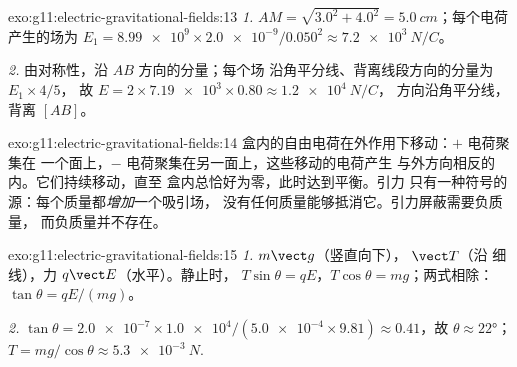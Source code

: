\begin{solution}{exo:g11:electric-gravitational-fields:13}
\emph{1.} $AM = \sqrt{3.0^2 + 4.0^2} = \qty{5.0}{cm}$；每个电荷
产生的场为 $E_1 = \num{8.99e9} \times \num{2.0e-9} / 0.050^2
\approx \qty{7.2e3}{N/C}$。

\emph{2.} 由对称性，沿 $AB$ 方向的分量；每个场
沿角平分线、背离线段方向的分量为 $E_1 \times 4/5$，
故 $E = 2 \times \num{7.19e3} \times 0.80 \approx \qty{1.2e4}{N/C}$，
方向沿角平分线，背离 $[AB]$。
\end{solution}

\begin{solution}{exo:g11:electric-gravitational-fields:14}
盒内的自由电荷在外作用下移动：$+$ 电荷聚集在
一个面上，$-$ 电荷聚集在另一面上，这些移动的电荷产生
与外方向相反的内。它们持续移动，直至
盒内总恰好为零，此时达到平衡。引力
只有一种符号的源：每个质量都\emph{增加}一个吸引场，
没有任何质量能够抵消它。引力屏蔽需要负质量，
而负质量并不存在。
\end{solution}

\begin{solution}{exo:g11:electric-gravitational-fields:15}
\emph{1.}  $m\vect g$（竖直向下）， $\vect T$（沿
细线），力 $q\vect E$（水平）。静止时，
$T\sin\theta = qE$，$T\cos\theta = mg$；两式相除：
$\tan\theta = qE/(mg)$。

\emph{2.} $\tan\theta = \num{2.0e-7} \times \num{1.0e4} /
(\num{5.0e-4} \times 9.81) \approx 0.41$，故 $\theta \approx \ang{22}$；
$T = mg/\cos\theta \approx \qty{5.3e-3}{N}$.
\end{solution}


